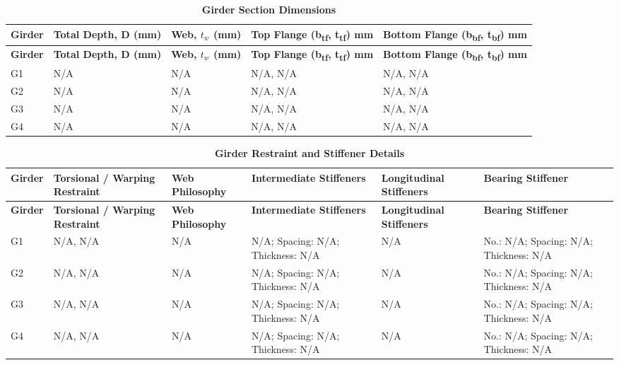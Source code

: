 \documentclass[12pt,a4paper]{report}
\numberwithin{table}{chapter}
\numberwithin{figure}{chapter}
\newcommand{\ReportTableSetup}{%
  \setlength{\tabcolsep}{3.0pt}%
  \renewcommand{\arraystretch}{1.18}%
  \setlength{\arrayrulewidth}{0.4pt}\setlength{\extrarowheight}{0.5pt}%
  \setlength{\LTleft}{\fill}\setlength{\LTright}{\fill}%
  \setlength{\LTpre}{4pt}\setlength{\LTpost}{8pt}}
\newcommand{\ReportTableFont}{\small}
\newcommand{\ReportRowGap}{3.0pt}
\newcommand{\ReportTableGap}{\vspace{0.5em}}
\begin{document}
\ReportTableGap

\ReportTableGap
\begingroup
\ReportTableSetup
\ReportTableFont
\begin{longtable}{|L{1.8000cm}|L{2.3000cm}|L{1.8000cm}|p{4.8000cm}|p{4.8000cm}|}
\caption{\textbf{Girder Section Dimensions}}\\
\hline
\textbf{Girder} & \textbf{Total Depth, D (mm)} & \textbf{Web, $t_w$ (mm)} & \textbf{Top Flange (b\textsubscript{tf}, t\textsubscript{tf}) mm} & \textbf{Bottom Flange (b\textsubscript{bf}, t\textsubscript{bf}) mm} \\[\ReportRowGap]
\hline
\endfirsthead
\hline
\textbf{Girder} & \textbf{Total Depth, D (mm)} & \textbf{Web, $t_w$ (mm)} & \textbf{Top Flange (b\textsubscript{tf}, t\textsubscript{tf}) mm} & \textbf{Bottom Flange (b\textsubscript{bf}, t\textsubscript{bf}) mm} \\[\ReportRowGap]
\hline
\endhead
\hline
\endfoot
\hline
\endlastfoot

G1 & N/A & N/A & N/A, N/A & N/A, N/A \\[\ReportRowGap]
\hline
G2 & N/A & N/A & N/A, N/A & N/A, N/A \\[\ReportRowGap]
\hline
G3 & N/A & N/A & N/A, N/A & N/A, N/A \\[\ReportRowGap]
\hline
G4 & N/A & N/A & N/A, N/A & N/A, N/A \\[\ReportRowGap]
\hline
\end{longtable}
\endgroup

\ReportTableGap

\ReportTableGap
\begingroup
\ReportTableSetup
\ReportTableFont
\begin{longtable}{|L{1.6000cm}|p{2.2000cm}|p{2.2000cm}|p{3.0000cm}|p{2.4000cm}|p{2.2000cm}|}
\caption{\textbf{Girder Restraint and Stiffener Details}}\\
\hline
\textbf{Girder} & \textbf{Torsional / Warping Restraint} & \textbf{Web Philosophy} & \textbf{Inter\-mediate Stiffeners} & \textbf{Longi\-tudinal Stiffeners} & \textbf{Bearing Stiffener} \\[\ReportRowGap]
\hline

\endfirsthead
\hline
\textbf{Girder} & \textbf{Torsional / Warping Restraint} & \textbf{Web Philosophy} & \textbf{Inter\-mediate Stiffeners} & \textbf{Longi\-tudinal Stiffeners} & \textbf{Bearing Stiffener} \\[\ReportRowGap]
\hline
\endhead


G1 & N/A, N/A & N/A & N/A; Spacing: N/A; Thickness: N/A & N/A & No.: N/A; Spacing: N/A; Thickness: N/A \\[\ReportRowGap]
\hline
G2 & N/A, N/A & N/A & N/A; Spacing: N/A; Thickness: N/A & N/A & No.: N/A; Spacing: N/A; Thickness: N/A \\[\ReportRowGap]
\hline
G3 & N/A, N/A & N/A & N/A; Spacing: N/A; Thickness: N/A & N/A & No.: N/A; Spacing: N/A; Thickness: N/A \\[\ReportRowGap]
\hline
G4 & N/A, N/A & N/A & N/A; Spacing: N/A; Thickness: N/A & N/A & No.: N/A; Spacing: N/A; Thickness: N/A \\[\ReportRowGap]
\hline
\end{longtable}
\endgroup
\end{document}
